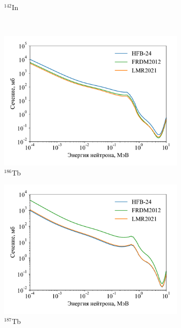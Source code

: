 \begin{figure}
\begin{subfigure}{0.48\textwidth}
    \caption{${}^{142}$In}
  \end{subfigure}
  \\
  \begin{subfigure}{0.48\textwidth}
    \centering
    \includegraphics[width=\textwidth]{pics/cs_tb186.pdf}
    \caption{${}^{186}$Tb}
  \end{subfigure}
  \hfil
  \begin{subfigure}{0.48\textwidth}
    \centering
    \includegraphics[width=\textwidth]{pics/cs_tb187.pdf}
    \caption{${}^{187}$Tb}
  \end{subfigure}
  \\
  \begin{subfigure}{0.48\textwidth}
    \centering

\end{subfigure}
\end{figure}
